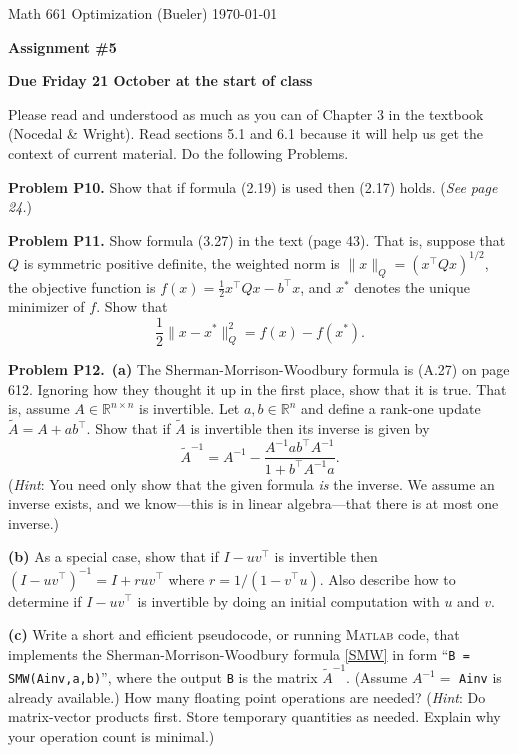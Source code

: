 \documentclass[12pt]{amsart}
\newcommand{\RR}{\mathbb{R}}
\newcommand{\Matlab}{\textsc{Matlab}\xspace}
\newcommand{\prob}[1]{\medskip\noindent\textbf{#1}\quad }
\newcommand{\epart}[1]{\medskip\noindent\textbf{(#1)}\quad }
\newcommand{\ppart}[1]{\,\textbf{(#1)}\quad }
\begin{document}
\scriptsize \noindent Math 661 Optimization (Bueler) \hfill \today
\normalsize

\medskip

\Large\centerline{\textbf{Assignment \#5}}
\large
\medskip

\centerline{\textbf{Due Friday 21 October at the start of class}}

\normalsize

\thispagestyle{empty}

\bigskip

\noindent Please read and understood as much as you can of Chapter 3 in the textbook (Nocedal \& Wright).  Read sections 5.1 and 6.1 because it will help us get the context of current material.  Do the following Problems.

\bigskip

\prob{Problem P10.}  Show that if formula (2.19) is used then (2.17) holds.  (\emph{See page 24.})


\prob{Problem P11.}  Show formula (3.27) in the text (page 43).  That is, suppose that $Q$ is symmetric positive definite, the weighted norm is $\|x\|_Q = (x^\top Q x)^{1/2}$, the objective function is $f(x) = \frac{1}{2} x^\top Q x - b^\top x$, and $x^*$ denotes the unique minimizer of $f$.  Show that
    $$\frac{1}{2} \|x - x^*\|_Q^2 = f(x) - f(x^*).$$


\prob{Problem P12.}  \ppart{a} The Sherman-Morrison-Woodbury formula is (A.27) on page 612.  Ignoring how they thought it up in the first place, show that it is true.  That is, assume $A \in \RR^{n\times n}$ is invertible.  Let $a,b \in \RR^n$ and define a rank-one update $\tilde A = A + a b^\top$.  Show that if $\tilde A$ is invertible then its inverse is given by
\begin{equation}
    \tilde A^{-1} = A^{-1} - \frac{A^{-1} a b^\top A^{-1}}{1 + b^\top A^{-1} a}.  \label{SMW}
\end{equation}
(\emph{Hint}:  You need only show that the given formula \emph{is} the inverse.  We assume an inverse exists, and we know---this is in linear algebra---that there is at most one inverse.)

\epart{b}  As a special case, show that if $I - u v^\top$ is invertible then $\left(I- u v^\top\right)^{-1} = I + r u v^\top$ where $r = 1 / (1 - v^\top u)$.  Also describe how to determine if $I - u v^\top$ is invertible by doing an initial computation with $u$ and $v$.

\epart{c}  Write a short and efficient pseudocode, or running \Matlab code, that implements the Sherman-Morrison-Woodbury formula \eqref{SMW} in form ``\texttt{B = SMW(Ainv,a,b)}'', where the output \texttt{B} is the matrix $\tilde A^{-1}$.  (Assume $A^{-1}=$ \texttt{Ainv} is already available.)  How many floating point operations are needed?  (\emph{Hint}:  Do matrix-vector products first.  Store temporary quantities as needed.  Explain why your operation count is minimal.)
\end{document}
